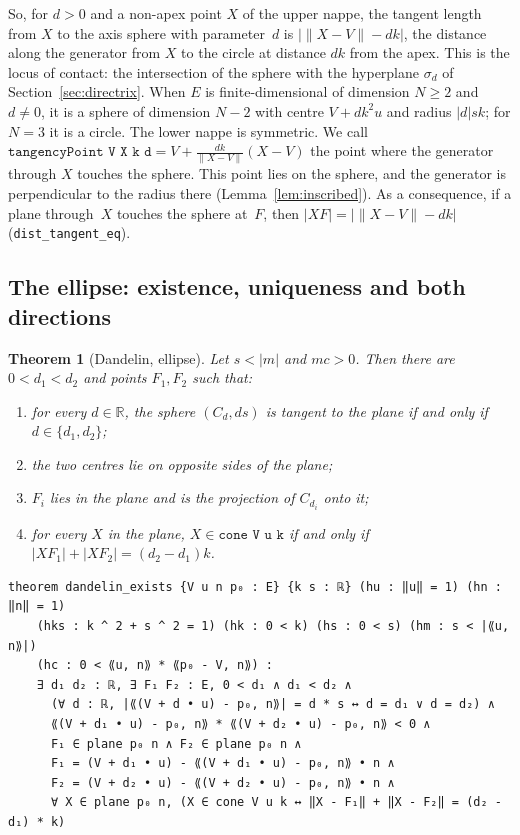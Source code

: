 \documentclass[11pt]{article}
\newtheorem{theorem}{Theorem}
\theoremstyle{remark}
\newcommand{\lean}[1]{\texttt{#1}}
\newcommand{\nm}[1]{\lVert #1\rVert}
\newcommand{\R}{\mathbb{R}}
\begin{document}
So, for $d>0$ and a non-apex point $X$ of the upper nappe, the tangent length from $X$ to the axis sphere with parameter~$d$ is
$|\nm{X-V}-dk|$, the distance along the generator from $X$ to the circle at distance $dk$ from the
apex. This is the locus of contact: the intersection of the sphere with the hyperplane $\sigma_d$ of
Section~\ref{sec:directrix}. When $E$ is finite-dimensional of dimension $N\ge2$ and $d\ne0$, it is a
sphere of dimension $N-2$ with centre $V+dk^2u$ and radius $|d|sk$; for $N=3$ it is a circle. The
lower nappe is symmetric. We call $\lean{tangencyPoint V X k d}=V+\frac{dk}{\nm{X-V}}(X-V)$ the point where the generator through $X$ touches the sphere.
This point lies on the sphere, and the generator is perpendicular to the radius there
(Lemma~\ref{lem:inscribed}). As a consequence, if a plane through~$X$ touches the sphere at~$F$, then
$|XF|=|\nm{X-V}-dk|$ (\lean{dist\_tangent\_eq}).

\subsection{The ellipse: existence, uniqueness and both directions}

\begin{theorem}[Dandelin, ellipse]\label{thm:ellipse}
Let $s<|m|$ and $mc>0$. Then there are $0<d_1<d_2$ and points $F_1,F_2$ such that:
\begin{enumerate}
\item[(i)] for every $d\in\R$, the sphere $(C_d,ds)$ is tangent to the plane if and only if
$d\in\{d_1,d_2\}$;
\item[(ii)] the two centres lie on opposite sides of the plane;
\item[(iii)] $F_i$ lies in the plane and is the projection of $C_{d_i}$ onto it;
\item[(iv)] for every $X$ in the plane, $X\in\lean{cone V u k}$ if and only if
$|XF_1|+|XF_2|=(d_2-d_1)k$.
\end{enumerate}
\end{theorem}

\begin{lstlisting}
theorem dandelin_exists {V u n p₀ : E} {k s : ℝ} (hu : ‖u‖ = 1) (hn : ‖n‖ = 1)
    (hks : k ^ 2 + s ^ 2 = 1) (hk : 0 < k) (hs : 0 < s) (hm : s < |⟪u, n⟫|)
    (hc : 0 < ⟪u, n⟫ * ⟪p₀ - V, n⟫) :
    ∃ d₁ d₂ : ℝ, ∃ F₁ F₂ : E, 0 < d₁ ∧ d₁ < d₂ ∧
      (∀ d : ℝ, |⟪(V + d • u) - p₀, n⟫| = d * s ↔ d = d₁ ∨ d = d₂) ∧
      ⟪(V + d₁ • u) - p₀, n⟫ * ⟪(V + d₂ • u) - p₀, n⟫ < 0 ∧
      F₁ ∈ plane p₀ n ∧ F₂ ∈ plane p₀ n ∧
      F₁ = (V + d₁ • u) - ⟪(V + d₁ • u) - p₀, n⟫ • n ∧
      F₂ = (V + d₂ • u) - ⟪(V + d₂ • u) - p₀, n⟫ • n ∧
      ∀ X ∈ plane p₀ n, (X ∈ cone V u k ↔ ‖X - F₁‖ + ‖X - F₂‖ = (d₂ - d₁) * k)
\end{lstlisting}
\end{document}

